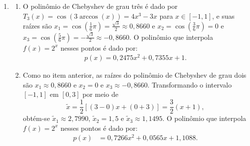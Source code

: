 \documentclass[12pt,a4paper]{article}
\begin{document}
\begin{enumerate}
\item \begin{enumerate}
   \item O polinômio de Chebyshev de grau três é dado por $T_3(x) = \cos(3\arccos(x)) = 4 x^3 - 3x$ para $x \in [-1, 1]$, e suas raízes são $x_1 = \cos\left(\frac{1}{6}\pi\right) = \frac{\sqrt{3}}{2} \approx 0,8660$ e $x_2 = \cos\left(\frac{3}{6}\pi\right) = 0$ e $x_3 = \cos\left(\frac{5}{6}\pi\right) = - \frac{\sqrt{3}}{2} \approx -0,8660$. O polinômio que interpola $f(x) = 2^x$ nesses pontos é dado por:
   \begin{align*}
      p(x)
      = 0,2475x^2 + 0,7355x + 1.
   \end{align*}
   \item Como no item anterior, as raízes do polinômio de Chebyshev de grau dois são $x_1 \approx 0,8660$ e $x_2 = 0$ e $x_3 \approx -0,8660$. Transformando o intervalo $[-1, 1]$ em $[0, 3]$ por meio de
   \[
   \tilde{x} = \frac{1}{2}[(3 - 0) x + (0 + 3)] = \frac{3}{2}(x + 1),
   \]
   obtém-se $\tilde{x}_1 \approx 2,7990$, $\tilde{x}_2 = 1,5$ e $\tilde{x}_3 \approx 1,1495$. O polinômio que interpola $f(x) = 2^x$ nesses pontos é dado por:
   \begin{align*}
      p(x)
      & = 0,7266x^2 + 0,0565x + 1,1088.
   \end{align*}
\end{enumerate}
\end{enumerate}
\end{document}
